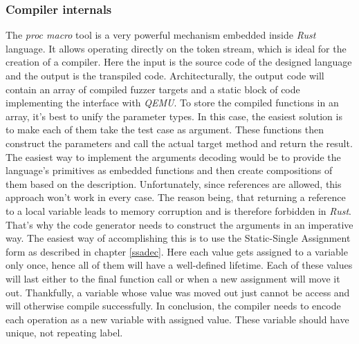 \subsubsection{Compiler internals}
The \textit{proc macro} tool is a very powerful mechanism embedded inside \textit{Rust} language. It allows operating directly on the token stream, which is ideal for the creation of a compiler. Here the input is the source code of the designed language and the output is the transpiled code. Architecturally, the output code will contain an array of compiled fuzzer targets and a static block of code implementing the interface with \textit{QEMU}. To store the compiled functions in an array, it's best to unify the parameter types. In this case, the easiest solution is to make each of them take the test case as argument. These functions then construct the parameters and call the actual target method and return the result. The easiest way to implement the arguments decoding would be to provide the language's primitives as embedded functions and then create compositions of them based on the description. Unfortunately, since references are allowed, this approach won't work in every case. The reason being, that returning a reference to a local variable leads to memory corruption and is therefore forbidden in \textit{Rust}. That's why the code generator needs to construct the arguments in an imperative way. The easiest way of accomplishing this is to use the Static-Single Assignment form as described in chapter \ref{ssadec}. Here each value gets assigned to a variable only once, hence all of them will have a well-defined lifetime. Each of these values will last either to the final function call or when a new assignment will move it out. Thankfully, a variable whose value was moved out just cannot be access and will otherwise compile successfully. In conclusion, the compiler needs to encode each operation as a new variable with assigned value. These variable should have unique, not repeating label.

